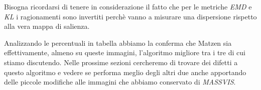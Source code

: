 \documentclass[%
	corpo=12pt,
    twoside,
    stile=classica,
    oldstyle,
    tipotesi=custom,
    greek,
    evenboxes,
]{toptesi}
\begin{document}
{Bisogna ricordarsi di tenere in considerazione il fatto che per le metriche \textit{EMD} e \textit{KL} i ragionamenti sono invertiti perchè vanno a misurare una dispersione rispetto alla vera mappa di salienza. 

Analizzando le percentuali in tabella abbiamo la conferma che Matzen sia effettivamente, almeno su queste immagini, l'algoritmo migliore tra i tre di cui stiamo discutendo. Nelle prossime sezioni cercheremo di trovare dei difetti a questo algoritmo e vedere se performa meglio degli altri due anche apportando delle piccole modifiche alle immagini che abbiamo conservato di \textit{MASSVIS}.

%

}
\end{document}
